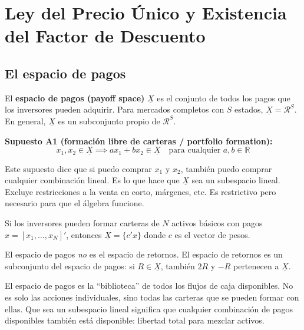 \documentclass[12pt]{article}
\begin{document}
\section{Ley del Precio \'Unico y Existencia del Factor de Descuento}

\subsection{El espacio de pagos}

El \textbf{espacio de pagos (payoff space)} $\underline{X}$ es el conjunto de todos los pagos que los inversores pueden adquirir. Para mercados completos con $S$ estados, $\underline{X} = \mathcal{R}^S$. En general, $\underline{X}$ es un subconjunto propio de $\mathcal{R}^S$.

\textbf{Supuesto A1 (formaci\'on libre de carteras / portfolio formation):}
\begin{equation}
    x_1, x_2 \in \underline{X} \implies ax_1 + bx_2 \in \underline{X} \quad \text{para cualquier } a, b \in \mathbb{R}
\end{equation}

\begin{intuicionmat}
Este supuesto dice que si puedo comprar $x_1$ y $x_2$, tambi\'en puedo comprar cualquier combinaci\'on lineal. Es lo que hace que $\underline{X}$ sea un subespacio lineal. Excluye restricciones a la venta en corto, m\'argenes, etc. Es restrictivo pero necesario para que el \'algebra funcione.
\end{intuicionmat}

Si los inversores pueden formar carteras de $N$ activos b\'asicos con pagos $x = [x_1, \ldots, x_N]'$, entonces $\underline{X} = \{c'x\}$ donde $c$ es el vector de pesos.

El espacio de pagos \emph{no} es el espacio de retornos. El espacio de retornos es un subconjunto del espacio de pagos: si $R \in \underline{X}$, tambi\'en $2R$ y $-R$ pertenecen a $\underline{X}$.

\begin{intuicion}
El espacio de pagos es la ``biblioteca'' de todos los flujos de caja disponibles. No es solo las acciones individuales, sino todas las carteras que se pueden formar con ellas. Que sea un subespacio lineal significa que cualquier combinaci\'on de pagos disponibles tambi\'en est\'a disponible: libertad total para mezclar activos.
\end{intuicion}
\end{document}
